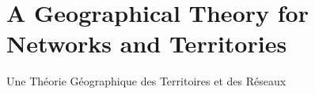 




\newpage

\section[A Geographical Theory][Une Théorie Géographique]{A Geographical Theory for Networks and Territories}{Une Théorie Géographique des Territoires et des Réseaux}

\label{sec:theory}




% 
% 
%
%



